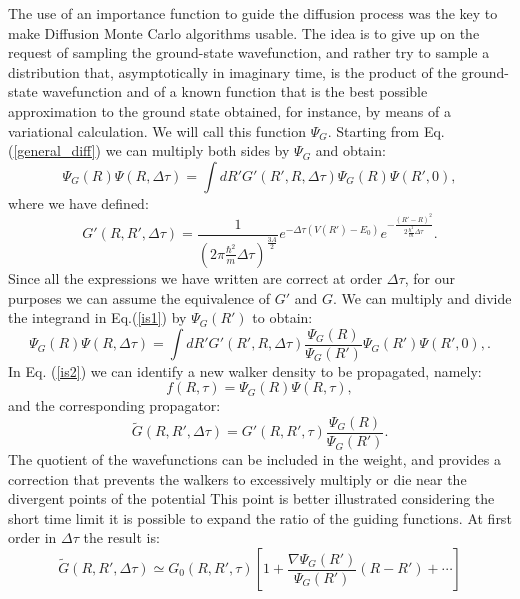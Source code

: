 The use of an importance function to guide the diffusion process  \cite{Anderson76}  was the key to make  Diffusion Monte Carlo algorithms usable. The idea is to give up on the request of sampling the ground-state wavefunction, and rather try to sample a distribution that, asymptotically in imaginary time, is the product of the ground-state wavefunction and of a known function that is the best possible approximation to the ground state obtained, for instance, by means of a variational calculation. We will call this function $\Psi_G$. Starting from Eq.(\ref{general_diff}) we can multiply both sides by $\Psi_G$ and obtain:
	\begin{equation}
	\Psi_G(R)\Psi(R,\Delta\tau)=\int dR' G'(R',R,\Delta\tau) \Psi_G(R)\Psi(R',0),\label{is1}
	\end{equation}
where we have defined:
\begin{equation}
G'(R,R',\Delta\tau)=\frac{1}{(2\pi\frac{\hbar^2}{m}\Delta\tau)^\frac{3A}{2}}e^{-\Delta\tau(V(R')-E_0)} e^{-\frac{(R'-R)^2}{2\frac{\hbar^2}{m}\Delta\tau}}.
\end{equation}
Since all the expressions we have written are correct at order $\Delta\tau$, for our purposes we can assume the equivalence of $G'$ and $G$. 
We can multiply and divide the  integrand in Eq.(\ref{is1}) by $\Psi_G(R')$ to obtain:
\begin{equation}
\Psi_G(R)\Psi(R,\Delta\tau)=\int dR' G'(R',R,\Delta\tau) \frac{\Psi_G(R)}{\Psi_G(R')}\Psi_G(R')\Psi(R',0),\label{is2}.
\end{equation}
In Eq. (\ref{is2}) we can identify a new walker density to be propagated, namely:
\begin{equation}
f(R,\tau)=\Psi_G(R)\Psi(R,\tau),
\end{equation}
and the corresponding propagator:
\begin{equation}
\tilde{G}(R,R',\Delta\tau)=G'(R,R',\tau)\frac{\Psi_G(R)}{\Psi_G(R')}.
\end{equation}
The quotient of the wavefunctions can be included in the weight, and provides a correction that prevents the walkers to excessively multiply or die near the divergent points of the potential
This point is better illustrated considering the short time limit it is possible to expand the ratio of the guiding functions. At first order in $\Delta\tau$ the result is:
\begin{equation}
\tilde{G}(R,R',\Delta\tau)\simeq G_0(R,R',\tau)\left[1+\frac{\nabla\Psi_G(R')}{\Psi_G(R')}(R-R')+\cdots\right]
\end{equation}
